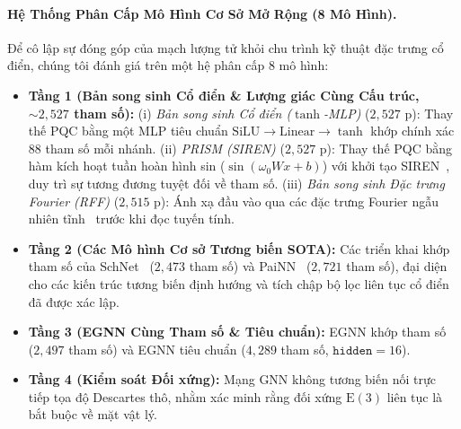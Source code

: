 \documentclass[10pt,twocolumn,letterpaper]{article}
\begin{document}
\paragraph{Hệ Thống Phân Cấp Mô Hình Cơ Sở Mở Rộng (8 Mô Hình).}
Để cô lập sự đóng góp của mạch lượng tử khỏi chu trình kỹ thuật đặc trưng cổ điển, chúng tôi đánh giá trên một hệ phân cấp 8 mô hình:
\begin{itemize}
    \item \textbf{Tầng 1 (Bản song sinh Cổ điển \& Lượng giác Cùng Cấu trúc, $\sim 2{,}527$ tham số):} 
    (i) \textit{Bản song sinh Cổ điển ($\tanh$-MLP)} ($2{,}527$ p): Thay thế PQC bằng một MLP tiêu chuẩn $\text{SiLU} \to \text{Linear} \to \tanh$ khớp chính xác 88 tham số mỗi nhánh.
    (ii) \textit{PRISM (SIREN)} ($2{,}527$ p): Thay thế PQC bằng hàm kích hoạt tuần hoàn hình sin ($\sin(\omega_0 W x + b)$) với khởi tạo SIREN~\cite{sitzmann2020siren}, duy trì sự tương đương tuyệt đối về tham số.
    (iii) \textit{Bản song sinh Đặc trưng Fourier (RFF)} ($2{,}515$ p): Ánh xạ đầu vào qua các đặc trưng Fourier ngẫu nhiên tĩnh~\cite{tancik2020fourier} trước khi đọc tuyến tính.
    \item \textbf{Tầng 2 (Các Mô hình Cơ sở Tương biến SOTA):} Các triển khai khớp tham số của SchNet~\cite{schütt2017schnetcontinuousfilterconvolutionalneural} ($2{,}473$ tham số) và PaiNN~\cite{schuttEquivariantMessagePassing2021} ($2{,}721$ tham số), đại diện cho các kiến trúc tương biến định hướng và tích chập bộ lọc liên tục cổ điển đã được xác lập.
    \item \textbf{Tầng 3 (EGNN Cùng Tham số \& Tiêu chuẩn):} EGNN khớp tham số~\cite{satorras2022enequivariantgraphneural} ($2{,}497$ tham số) và EGNN tiêu chuẩn ($4{,}289$ tham số, $\texttt{hidden}=16$).
    \item \textbf{Tầng 4 (Kiểm soát Đối xứng):} Mạng GNN không tương biến nối trực tiếp tọa độ Descartes thô, nhằm xác minh rằng đối xứng $\mathrm{E}(3)$ liên tục là bắt buộc về mặt vật lý.
\end{itemize}
\end{document}
